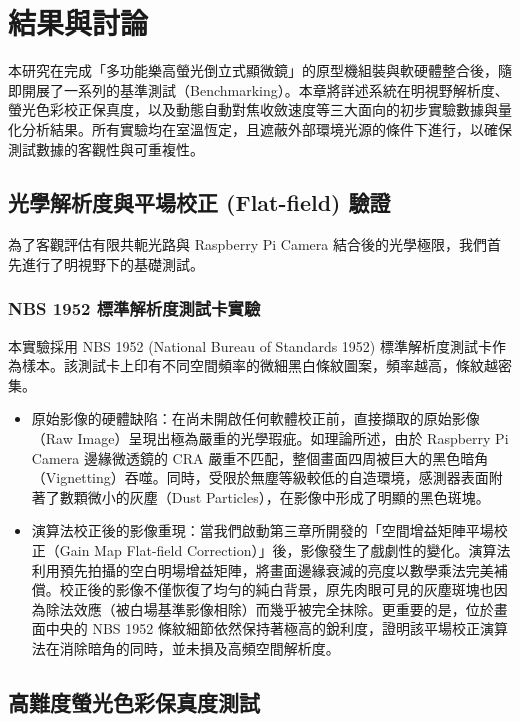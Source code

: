 
\chapter{結果與討論}

本研究在完成「多功能樂高螢光倒立式顯微鏡」的原型機組裝與軟硬體整合後，隨即開展了一系列的基準測試（Benchmarking）。本章將詳述系統在明視野解析度、螢光色彩校正保真度，以及動態自動對焦收斂速度等三大面向的初步實驗數據與量化分析結果。所有實驗均在室溫恆定，且遮蔽外部環境光源的條件下進行，以確保測試數據的客觀性與可重複性。

\section{光學解析度與平場校正 (Flat-field) 驗證}

為了客觀評估有限共軛光路與 Raspberry Pi Camera 結合後的光學極限，我們首先進行了明視野下的基礎測試。

\subsection{NBS 1952 標準解析度測試卡實驗}
本實驗採用 NBS 1952 (National Bureau of Standards 1952) 標準解析度測試卡作為樣本。該測試卡上印有不同空間頻率的微細黑白條紋圖案，頻率越高，條紋越密集。
\begin{itemize}
    \item 原始影像的硬體缺陷：在尚未開啟任何軟體校正前，直接擷取的原始影像（Raw Image）呈現出極為嚴重的光學瑕疵。如理論所述，由於 Raspberry Pi Camera 邊緣微透鏡的 CRA 嚴重不匹配，整個畫面四周被巨大的黑色暗角（Vignetting）吞噬。同時，受限於無塵等級較低的自造環境，感測器表面附著了數顆微小的灰塵（Dust Particles），在影像中形成了明顯的黑色斑塊。
    \item 演算法校正後的影像重現：當我們啟動第三章所開發的「空間增益矩陣平場校正（Gain Map Flat-field Correction）」後，影像發生了戲劇性的變化。演算法利用預先拍攝的空白明場增益矩陣，將畫面邊緣衰減的亮度以數學乘法完美補償。校正後的影像不僅恢復了均勻的純白背景，原先肉眼可見的灰塵斑塊也因為除法效應（被白場基準影像相除）而幾乎被完全抹除。更重要的是，位於畫面中央的 NBS 1952 條紋細節依然保持著極高的銳利度，證明該平場校正演算法在消除暗角的同時，並未損及高頻空間解析度。
\end{itemize}

\section{高難度螢光色彩保真度測試}

